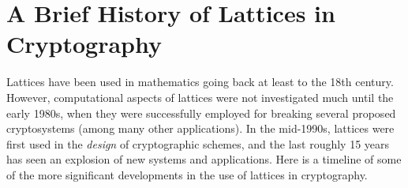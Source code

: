 \documentclass[11pt]{article}
\begin{document}
\thispagestyle{fancy}           %


\section{A Brief History of Lattices in Cryptography}
\label{sec:brief-hist}

Lattices have been used in mathematics going back at least to the 18th
century. However, computational aspects of lattices were not
investigated much until the early 1980s, when they were successfully
employed for breaking several proposed cryptosystems (among many other
applications). In the mid-1990s, lattices were first used in the
\emph{design} of cryptographic schemes, and the last roughly 15 years
has seen an explosion of new systems and applications. Here is a
timeline of some of the more significant developments in the use of
lattices in cryptography.
\end{document}
